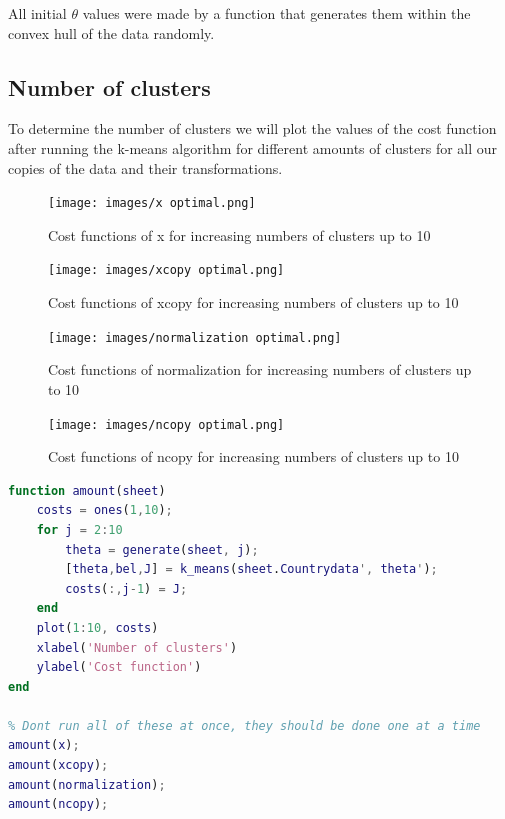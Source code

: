 \documentclass[12pt, a4paper]{article}
\begin{document}
All initial $\theta$ values were made by a function that generates them within the convex hull of the data randomly.

\subsection{Number of clusters}

To determine the number of clusters we will plot the values of the cost function after running the k-means algorithm for different amounts of clusters for all our copies of the data and their transformations.

\begin{figure}[H]
    \centering
    \texttt{[image: images/x optimal.png]}
    \caption{Cost functions of x for increasing numbers of clusters up to 10}
    \label{fig:x-optimal}
\end{figure}

\begin{figure}[H]
    \centering
    \texttt{[image: images/xcopy optimal.png]}
    \caption{Cost functions of xcopy for increasing numbers of clusters up to 10}
    \label{fig:xcopy-optimal}
\end{figure}

\begin{figure}[H]
    \centering
    \texttt{[image: images/normalization optimal.png]}
    \caption{Cost functions of normalization for increasing numbers of clusters up to 10}
    \label{fig:normalization-optimal}
\end{figure}

\begin{figure}[H]
    \centering
    \texttt{[image: images/ncopy optimal.png]}
    \caption{Cost functions of ncopy for increasing numbers of clusters up to 10}
    \label{fig:ncopy-optimal}
\end{figure}

\begin{lstlisting}[language=Matlab, label=lst:optimals, caption=The code that implements the visualization of the cost function with changing numbers of clusters. In order to replicate the above graphs the 4 calls of the function at the end should be done one by one]
% Implementing a function to find the number of clusters
function amount(sheet)
    costs = ones(1,10);
    for j = 2:10
        theta = generate(sheet, j);
        [theta,bel,J] = k_means(sheet.Countrydata', theta');
        costs(:,j-1) = J;
    end
    plot(1:10, costs)
    xlabel('Number of clusters')
    ylabel('Cost function')
end

% Dont run all of these at once, they should be done one at a time
amount(x);
amount(xcopy);
amount(normalization);
amount(ncopy);
\end{lstlisting}
\end{document}
